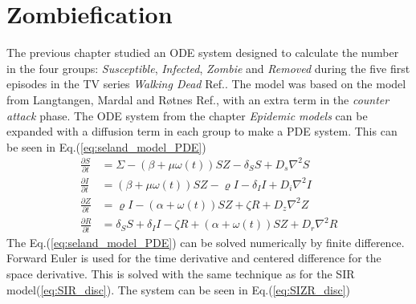 \documentclass[%
twoside,                 %
final,                   %
chapterprefix=true,      %
open=right               %
10pt]{book}
\begin{document}
\section{Zombiefication}
\label{section:2_zombiefication}
The previous chapter studied an ODE system designed to calculate the number in the four groups: \emph{Susceptible}, \emph{Infected}, \emph{Zombie} and \emph{Removed} during the five first episodes in the TV series \emph{Walking Dead} Ref.\cite{walking_dead}. The model was based on the model from Langtangen, Mardal and Røtnes Ref.\cite{zombie-math}, with an extra term in the \emph{counter attack} phase. The ODE system from the chapter \emph{Epidemic models} can be expanded with a diffusion term in each group to make a PDE system. This can be seen in Eq.(\ref{eq:seland_model_PDE})  
\begin{equation} \label{eq:seland_model_PDE}
	\begin{aligned} 
	\frac{\partial S}{\partial t} &= \Sigma -(\beta+\mu \omega(t))SZ - \delta_SS +D_s\nabla^2 S \\
	\frac{\partial I}{\partial t} &= (\beta+\mu \omega(t))SZ - \varrho I - \delta_II+D_i\nabla^2 I \\
	\frac{\partial Z}{\partial t} &= \varrho I- (\alpha+\omega(t))SZ + \zeta R+D_z\nabla^2 Z \\
	\frac{\partial R}{\partial t} &= \delta_SS +\delta_II -\zeta R + (\alpha+\omega(t))SZ+D_r\nabla^2 R 
	\end{aligned}
\end{equation}
The Eq.(\ref{eq:seland_model_PDE}) can be solved numerically by finite difference. Forward Euler is used for the time derivative and centered difference for the space derivative. This is solved with the same technique as for the SIR model(\ref{eq:SIR_disc}). The system can be seen in Eq.(\ref{eq:SIZR_disc})
\end{document}
